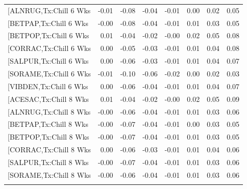 \documentclass{article}\usepackage[]{graphicx}\usepackage[]{color}
\begin{document}
\begin{longtable}{lrrrrrrr}
  [ALNRUG,Tx:Chill 6 Wks & -0.01 & -0.08 & -0.04 & -0.01 & 0.00 & 0.02 & 0.05 \\ 
  [BETPAP,Tx:Chill 6 Wks & -0.00 & -0.08 & -0.04 & -0.01 & 0.01 & 0.03 & 0.05 \\ 
  [BETPOP,Tx:Chill 6 Wks & 0.01 & -0.04 & -0.02 & -0.00 & 0.02 & 0.05 & 0.08 \\ 
  [CORRAC,Tx:Chill 6 Wks & 0.00 & -0.05 & -0.03 & -0.01 & 0.01 & 0.04 & 0.08 \\ 
  [SALPUR,Tx:Chill 6 Wks & 0.00 & -0.06 & -0.03 & -0.01 & 0.01 & 0.04 & 0.07 \\ 
  [SORAME,Tx:Chill 6 Wks & -0.01 & -0.10 & -0.06 & -0.02 & 0.00 & 0.02 & 0.03 \\ 
  [VIBDEN,Tx:Chill 6 Wks & 0.00 & -0.06 & -0.04 & -0.01 & 0.01 & 0.04 & 0.07 \\ 
  [ACESAC,Tx:Chill 8 Wks & 0.01 & -0.04 & -0.02 & -0.00 & 0.02 & 0.05 & 0.09 \\ 
  [ALNRUG,Tx:Chill 8 Wks & -0.00 & -0.06 & -0.04 & -0.01 & 0.01 & 0.03 & 0.06 \\ 
  [BETPAP,Tx:Chill 8 Wks & -0.00 & -0.07 & -0.04 & -0.01 & 0.00 & 0.03 & 0.05 \\ 
  [BETPOP,Tx:Chill 8 Wks & -0.00 & -0.07 & -0.04 & -0.01 & 0.01 & 0.03 & 0.05 \\ 
  [CORRAC,Tx:Chill 8 Wks & 0.00 & -0.06 & -0.03 & -0.01 & 0.01 & 0.04 & 0.06 \\ 
  [SALPUR,Tx:Chill 8 Wks & -0.00 & -0.07 & -0.04 & -0.01 & 0.01 & 0.03 & 0.06 \\ 
  [SORAME,Tx:Chill 8 Wks & -0.00 & -0.06 & -0.04 & -0.01 & 0.01 & 0.03 & 0.06 \\ 
   \hline
\hline
\label{tab:suppmodtough}
\end{longtable}
\end{document}
